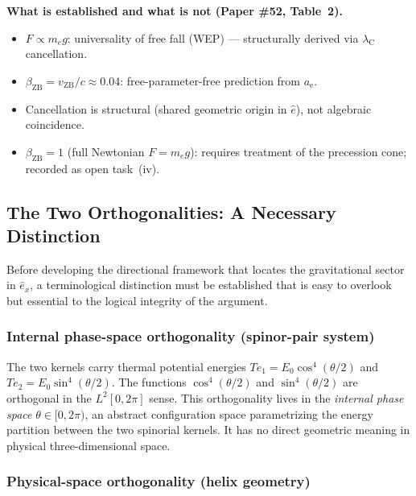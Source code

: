 \documentclass[12pt,letterpaper]{article}
\newcommand{\paperno}[1]{\textbf{\#{}#1}}
\newcommand{\vZB}{v_{\mathrm{ZB}}}
\newcommand{\lambdaC}{\lambda_{\mathrm{C}}}
\newcommand{\iphase}{\theta}
\newcommand{\anom}{a_{\mathrm{e}}}
\newcommand{\ehat}[1]{\hat{e}_{#1}}
\newcommand{\betaZB}{\beta_{\mathrm{ZB}}}
\begin{document}
\begin{mdframed}[style=orangebox]
\textbf{What is established and what is not (Paper \paperno{52}, Table~2).}
\begin{itemize}[leftmargin=2em, itemsep=2pt]
  \item[$\checkmark$] $F\propto m_e g$: universality of free fall (WEP) — structurally derived via $\lambdaC$ cancellation.
  \item[$\checkmark$] $\betaZB = \vZB/c\approx 0.04$: free-parameter-free prediction from $\anom$.
  \item[$\checkmark$] Cancellation is structural (shared geometric origin in $\hat{e}$), not algebraic coincidence.
  \item[$\blacksquare$] $\betaZB = 1$ (full Newtonian $F = m_e g$): requires treatment of the precession cone; recorded as open task~(iv).
\end{itemize}
\end{mdframed}

\subsection{The Two Orthogonalities: A Necessary Distinction}
\label{subsec:two_ortho}

Before developing the directional framework that locates the gravitational sector in $\ehat{x}$, a terminological distinction must be established that is easy to overlook but essential to the logical integrity of the argument.

\subsubsection{Internal phase-space orthogonality (spinor-pair system)}

The two kernels carry thermal potential energies $Te_1 = E_0\cos^4(\iphase/2)$ and $Te_2 = E_0\sin^4(\iphase/2)$. The functions $\cos^4(\iphase/2)$ and $\sin^4(\iphase/2)$ are orthogonal in the $L^2[0,2\pi]$ sense. This orthogonality lives in the \emph{internal phase space} $\iphase\in[0,2\pi)$, an abstract configuration space parametrizing the energy partition between the two spinorial kernels. It has no direct geometric meaning in physical three-dimensional space.

\subsubsection{Physical-space orthogonality (helix geometry)}
\end{document}
